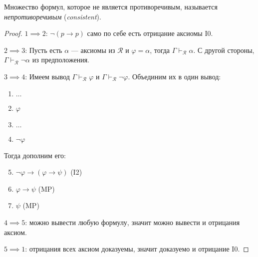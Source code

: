 \documentclass[12pt]{article}
\let\im\rightarrow
\let\n\neg
\theoremstyle{definition}
\theoremstyle{statement}
\theoremstyle{theorem}
\begin{document}
Множество формул, которое не является противоречивым, называется
\textit{непротиворечивым} (\textit{consistent}).

\begin{proof}
  $1 \implies 2$: $\n (p \im p)$ само по себе есть отрицание аксиомы I0.

  $2 \implies 3$:
  Пусть есть $\alpha$ --- аксиомы из $\mathcal{R}$ и $\varphi =
  \alpha$, тогда $\Gamma \vdash_{\mathcal{R}} \alpha$. С другой
  стороны, $\Gamma \vdash_{\mathcal{R}} \n \alpha$ из предположения.

  $3 \implies 4$:
  Имеем вывод $\Gamma \vdash_{\mathcal{R}} \varphi$ и $\Gamma
  \vdash_{\mathcal{R}} \n \varphi$. Объединим их в один вывод:
  \begin{enumerate}
    \item $\dots$

    \item $\varphi$

    \item $\dots$

    \item $\n \varphi$
  \end{enumerate}

  Тогда дополним его:
  \begin{enumerate}
      \setcounter{enumi}{4}

    \item $\n \varphi \im (\varphi \im \psi)$ (I2)

    \item $\varphi \im \psi$ (MP)

    \item $\psi$ (MP)
  \end{enumerate}

  $4 \implies 5$: можно вывести любую формулу, значит можно вывести и
  отрицания аксиом.

  $5 \implies 1$: отрицания всех аксиом доказуемы, значит доказуемо и
  отрицание I0.
\end{proof}
\end{document}
